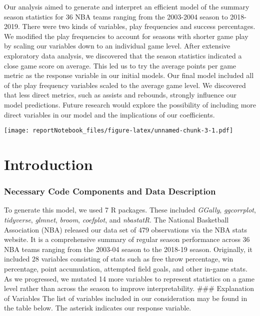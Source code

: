 \documentclass[
]{article}
\begin{document}
Our analysis aimed to generate and interpret an efficient model of the
summary season statistics for 36 NBA teams ranging from the 2003-2004
season to 2018-2019. There were two kinds of variables, play frequencies
and success percentages. We modified the play frequencies to account for
seasons with shorter game play by scaling our variables down to an
individual game level. After extensive exploratory data analysis, we
discovered that the season statistics indicated a close game score on
average. This led us to try the average points per game metric as the
response variable in our initial models. Our final model included all of
the play frequency variables scaled to the average game level. We
discovered that less direct metrics, such as assists and rebounds,
strongly influence our model predictions. Future research would explore
the possibility of including more direct variables in our model and the
implications of our coefficients.

\texttt{[image: reportNotebook\_files/figure-latex/unnamed-chunk-3-1.pdf]}

\hypertarget{introduction}{%
\section{Introduction}\label{introduction}}

\hypertarget{necessary-code-components-and-data-description}{%
\subsubsection{Necessary Code Components and Data
Description}\label{necessary-code-components-and-data-description}}

To generate this model, we used 7 R packages. These included
\emph{GGally}, \emph{ggcorrplot}, \emph{tidyverse}, \emph{glmnet},
\emph{broom}, \emph{coefplot}, and \emph{nbastatR}. The National
Basketball Association (NBA) released our data set of 479 observations
via the NBA stats website. It is a comprehensive summary of regular
season performance across 36 NBA teams ranging from the 2003-04 season
to the 2018-19 season. Originally, it included 28 variables consisting
of stats such as free throw percentage, win percentage, point
accumulation, attempted field goals, and other in-game stats. As we
progressed, we mutated 14 more variables to represent statistics on a
game level rather than across the season to improve interpretability.
\#\#\# Explanation of Variables The list of variables included in our
consideration may be found in the table below. The asterisk indicates
our response variable.
\end{document}
